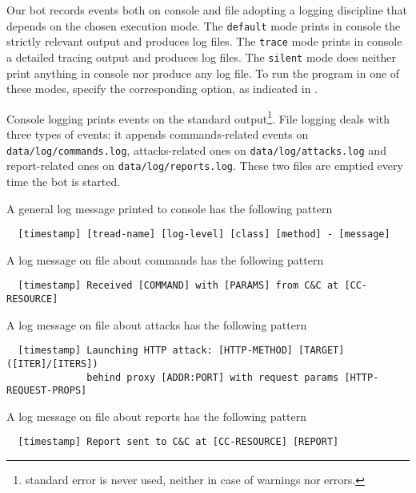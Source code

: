 Our bot records events both on console and file adopting a logging discipline that depends on the chosen execution mode. The \texttt{default} mode prints in console the strictly relevant output and produces log files. The \texttt{trace} mode prints in console a detailed tracing output and produces log files. The \texttt{silent} mode does neither print anything in console nor produce any log file.
To run the program in one of these modes, specify the corresponding option, as indicated in .

Console logging prints events on the standard output\footnote{standard error is never used, neither in case of warnings nor errors.}.
File logging deals with three types of events: it appends commands-related events on \texttt{data/log/commands.log}, attacks-related ones on \texttt{data/log/attacks.log} and report-related ones on \texttt{data/log/reports.log}. These two files are emptied every time the bot is started.

A general log message printed to console has the following pattern

\begin{verbatim}
  [timestamp] [tread-name] [log-level] [class] [method] - [message]
\end{verbatim}

A log message on file about commands has the following pattern

\begin{verbatim}
  [timestamp] Received [COMMAND] with [PARAMS] from C&C at [CC-RESOURCE]
\end{verbatim}

A log message on file about attacks has the following pattern

\begin{verbatim}
  [timestamp] Launching HTTP attack: [HTTP-METHOD] [TARGET] ([ITER]/[ITERS])
              behind proxy [ADDR:PORT] with request params [HTTP-REQUEST-PROPS]
\end{verbatim}

A log message on file about reports has the following pattern

\begin{verbatim}
  [timestamp] Report sent to C&C at [CC-RESOURCE] [REPORT]
\end{verbatim}
